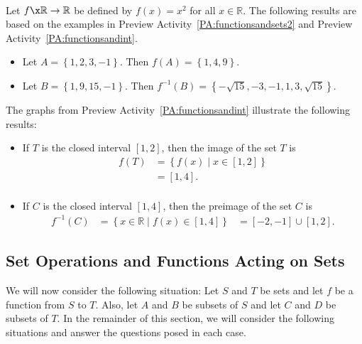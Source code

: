 \begin{example}\label{exam:imageandinverse} \hfill \\
Let $f\x  \mathbb{R} \to \mathbb{R}$ be defined by $f ( x ) = x^2$ for all 
$x \in \mathbb{R}$.  The following results are based on the examples in 
Preview Activity~\ref{PA:functionsandsets2} and Preview Activity~\ref{PA:functionsandint}.

\begin{itemize}
\item Let $A = \left\{ 1, 2, 3, -1 \right\}$.  Then
$f ( A ) = \left\{ 1, 4, 9 \right\}$.

\item Let $B = \left\{ 1, 9, 15, -1 \right\}$.  Then 
$f^{-1} ( B ) = \left\{ -\sqrt{15}, -3, -1, 1, 3, \sqrt{15} \right\}$.
\end{itemize}

%
\noindent
The graphs from Preview Activity~\ref{PA:functionsandint} illustrate the following results:
\begin{itemize}
\item If $T$ is the closed interval $\left[ 1, 2 \right]$, then the image of the set $T$ is
\[
\begin{aligned}
f ( T ) &= \left\{ f ( x ) \mid x \in \left[ 1, 2 \right] \right\} \\
                   &= \left[ 1, 4 \right]. \\
\end{aligned}
\]

\item If $C$ is the closed interval $\left[ 1, 4 \right]$, then the preimage of the set 
$C$ is
\[
\begin{aligned}
f^{-1} ( C ) &= \left\{ x \in \mathbb{R} \mid f ( x ) \in \left[ 1, 4 \right] \right\}
                        &= \left[ -2, -1 \right] \cup \left[ 1, 2 \right].
\end{aligned}
\]
\end{itemize}
\end{example}
\hbreak

\subsection*{Set Operations and Functions Acting on Sets}
We will now consider the following situation:  Let $S$ and $T$ be sets and let $f$ be a function from $S$ to $T$.  Also, let $A$ and $B$ be subsets of $S$ and let $C$ and $D$ be subsets of $T$.  In the remainder of this section, we will consider the following situations and answer the questions posed in each case.

